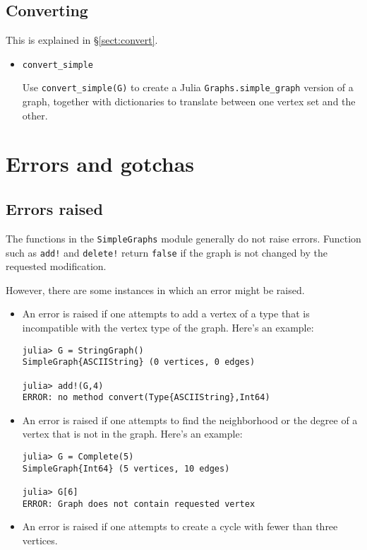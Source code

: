 \documentclass[oneside]{amsart}
\begin{document}
\subsection*{Converting}

This is explained in \S\ref{sect:convert}.

\begin{itemize}
\item \verb|convert_simple|

  Use \verb|convert_simple(G)| to create a Julia
  \verb|Graphs.simple_graph| version of a graph, together with
  dictionaries to translate between one vertex set and the other.
\end{itemize}

\section{Errors and gotchas}

\subsection*{Errors raised}
The functions in the \verb|SimpleGraphs| module generally do not
raise errors. Function such as \verb|add!| and \verb|delete!| return
\verb|false| if the graph is not changed by the requested
modification.

However, there are some instances in which an error might be raised.
\begin{itemize}
\item An error is raised if one attempts to add a vertex of a type
  that is incompatible with the vertex type of the graph. Here's an
  example:
\begin{verbatim}
julia> G = StringGraph()
SimpleGraph{ASCIIString} (0 vertices, 0 edges)

julia> add!(G,4)
ERROR: no method convert(Type{ASCIIString},Int64)
\end{verbatim}

\item An error is raised if one attempts to find the neighborhood or
  the degree of a vertex that is not in the graph. Here's an example:
\begin{verbatim}
julia> G = Complete(5)
SimpleGraph{Int64} (5 vertices, 10 edges)

julia> G[6]
ERROR: Graph does not contain requested vertex
\end{verbatim}

\item An error is raised if one attempts to create a cycle with fewer
  than three vertices.
\end{itemize}
\end{document}
